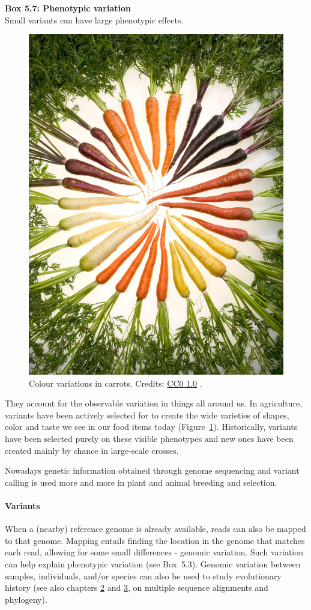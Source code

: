 \begin{framed}
\textbf{Box 5.7: Phenotypic variation}\\
Small variants can have large phenotypic effects.

\begin{figure}[!htbp]
\centering
\includegraphics[width=0.25\linewidth]{files/carrots-c58b6efdae05aa74dcdaa9a4c1da4f00.jpg}
\caption[]{Colour variations in carrots. \newline
Credits: \href{https://creativecommons.org/publicdomain/zero/1.0/}{CC0 1.0} \cite{carrots_2006}.}
\label{carrots}
\end{figure}

They account for the observable variation in things all around us. In
agriculture, variants have been actively selected for to create the wide
varieties of shapes, color and taste we see in our food items today (Figure~\ref{carrots}).
Historically, variants have been selected purely on these visible phenotypes
and new ones have been created mainly by chance in large-scale crosses.

Nowadays genetic information obtained through genome sequencing and variant
calling is used more and more in plant and animal breeding and selection.
\end{framed}

\paragraph{Variants}\label{chapter5_variants}

When a (nearby) reference genome is already available, reads can also be
mapped to that genome. Mapping entails finding the location in the genome
that matches each read, allowing for some small differences - genomic variation. Such variation can help
explain phenotypic variation (see Box~5.3). Genomic variation
between samples, individuals, and/or species can also be used to study
evolutionary history (see also chapters \href{/chapter2}{2} and \href{/chapter3}{3}, on multiple sequence
alignments and phylogeny).

